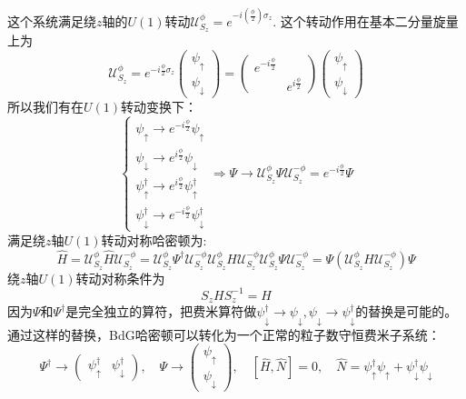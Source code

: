 \documentclass{article}
\numberwithin{equation}{subsection}
\newcommand{\mU}{\mathcal{U}}
\begin{document}
这个系统满足绕$z$轴的$U(1)$转动$\mU_{S_z}^\phi=e^{-i(\frac{\phi}{2})\sigma_z}$. 这个转动作用在基本二分量旋量上为
\begin{equation}
    \mU_{S_z}^{\phi}=e^{-i\frac{\phi}{2}\sigma_z}\begin{pmatrix}
        \psi_\uparrow\\
        \psi_\downarrow
    \end{pmatrix}=\begin{pmatrix}
        e^{-i\frac{\phi}{2}}\\
        &e^{i\frac{\phi}{2}}
    \end{pmatrix}\begin{pmatrix}
        \psi_\uparrow\\
        \psi_\downarrow
    \end{pmatrix}
\end{equation}
所以我们有在$U(1)$转动变换下：
\begin{equation}
    \begin{cases}
        \psi_\uparrow\rightarrow e^{-i\frac{\phi}{2}}\psi_\uparrow\\
        \psi_\downarrow\rightarrow e^{i\frac{\phi}{2}}\psi_\downarrow\\
        \psi_\uparrow^\dagger\rightarrow e^{i\frac{\phi}{2}}\psi_\uparrow^\dagger\\
        \psi_\downarrow^\dagger\rightarrow e^{-i\frac{\phi}{2}}\psi_\downarrow^\dagger
    \end{cases}\Rightarrow\Psi\rightarrow\mU_{S_z}^\phi\Psi\mU_{S_z}^{-\phi}= e^{-i\frac{\phi}{2}}\Psi
\end{equation}
满足绕$z$轴$U(1)$转动对称哈密顿为:
\begin{equation}
    \hat{H}=\mU_{S_z}^{\phi}\hat{H}\mU_{S_z}^{-\phi}=\mU_{S_z}^{\phi}\Psi^\dagger\mU_{S_z}^{-\phi}\mU_{S_z}^{\phi}H\mU_{S_z}^{-\phi}\mU_{S_z}^{\phi}\Psi\mU_{S_z}^{-\phi}=\Psi(\mU_{S_z}^{\phi}H\mU_{S_z}^{-\phi})\Psi
\end{equation}
绕$z$轴$U(1)$转动对称条件为
\begin{equation}
    S_zHS_z^{-1}=H
\end{equation}
因为$\Psi$和$\Psi^\dagger$是完全独立的算符，把费米算符做$\psi_{\downarrow}^\dagger\rightarrow \psi_\downarrow,\psi_{\downarrow}\rightarrow\psi_\downarrow^\dagger$的替换是可能的。通过这样的替换，BdG哈密顿可以转化为一个正常的粒子数守恒费米子系统：
\begin{equation}
    \Psi^\dagger\rightarrow\begin{pmatrix}
        \psi_\uparrow^\dagger&\psi_\downarrow^\dagger
    \end{pmatrix},\quad \Psi\rightarrow\begin{pmatrix}
        \psi_\uparrow\\
        \psi_\downarrow
    \end{pmatrix},\quad [\hat{H},\hat{N}]=0,\quad \hat{N}=\psi_\uparrow^\dagger\psi_\uparrow+\psi_\downarrow^\dagger\psi_\downarrow
\end{equation}
\end{document}
